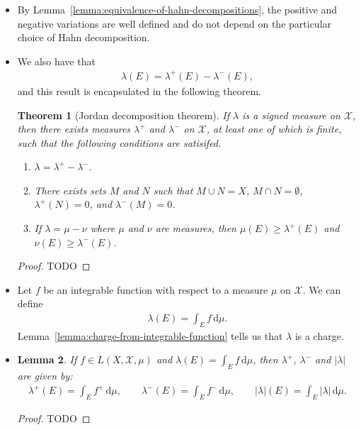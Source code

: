 \documentclass[10pt]{article}
\newtheorem{lemma}{Lemma}
\newtheorem{theorem}[lemma]{Theorem}
\newcommand{\dee}{\mathrm{d}}
\newcommand{\mcal}[1]{\mathcal{#1}}
\begin{document}
\begin{itemize}
  \item By Lemma~\ref{lemma:equivalence-of-hahn-decompositions}, the positive and negative variations are well defined and do not depend on the particular choice of Hahn decomposition.
  
  \item We also have that
  \begin{align*}
    \lambda(E) = \lambda^+(E) - \lambda^-(E),
  \end{align*}
  and this result is encapsulated in the following theorem.

  \begin{theorem}[Jordan decomposition theorem]
    If $\lambda$ is a signed measure on $\mcal{X}$, then there exists measures $\lambda^+$ and  $\lambda^-$ on $\mcal{X}$, at least one of which is finite, such that the following conditions are satisifed.
    \begin{enumerate}
      \item[(a)]  $\lambda = \lambda^+ - \lambda^-$. 
      \item[(b)] There exists sets $M$ and $N$ such that $M \cup N = X$, $M \cap N = \emptyset$, $\lambda^+(N) = 0$, and $\lambda^-(M) = 0$.
      \item[(c)] If $\lambda = \mu - \nu$ where $\mu$ and $\nu$ are measures, then $\mu(E) \geq \lambda^+(E)$ and $\nu(E) \geq \lambda^-(E)$.
    \end{enumerate}    
  \end{theorem}

  \begin{proof}
    TODO
  \end{proof}

  \item Let $f$ be an integrable function with respect to a measure $\mu$ on $\mcal{X}$. We can define
  \begin{align*}
    \lambda(E) = \int_E f\, \dee\mu.
  \end{align*}
  Lemma~\ref{lemma:charge-from-integrable-function} tells us that $\lambda$ is a charge.

  \item \begin{lemma}
    If $f \in L(X,\mcal{X},\mu)$ and $\lambda(E) = \int_E f\, \dee\mu$, then $\lambda^+$, $\lambda^-$ and $|\lambda|$ are given by:
    \begin{align*}
      \lambda^+(E) = \int_E f^+\, \dee\mu, \qquad 
      \lambda^-(E) = \int_E f^-\, \dee\mu, \qquad 
      |\lambda|(E) = \int_E |\lambda|\, \dee\mu.
    \end{align*}
  \end{lemma}  

  \begin{proof}
    TODO
  \end{proof}
\end{itemize}
\end{document}

